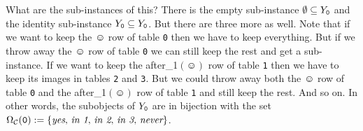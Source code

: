 \documentclass[CT4S-EN-RU]{subfiles}
\begin{document}
\begin{example}
\begin{center}
\end{center}

What are the sub-instances of this? There is the empty sub-instance $\emptyset\ss Y_{\tt 0}$ and the identity sub-instance $Y_{\tt 0}\ss Y_{\tt 0}$. But there are three more as well. Note that if we want to keep the $\smiley$ row of table {\tt 0} then we have to keep everything. But if we throw away the $\smiley$ row of table {\tt 0} we can still keep the rest and get a sub-instance. If we want to keep the after\_1$(\smiley)$ row of table {\tt 1} then we have to keep its images in tables {\tt 2} and {\tt 3}. But we could throw away both the $\smiley$ row of table {\tt 0} and the after\_1$(\smiley)$ row of table {\tt 1} and still keep the rest. And so on. In other words, the subobjects of $Y_{\tt 0}$ are in bijection with the set $\Omega_\mcC({\tt 0}):=\{\tn{{\it yes}, {\it in 1}, {\it in 2}, {\it in 3}, {\it never}}\}$. 


\end{example}
\end{document}
